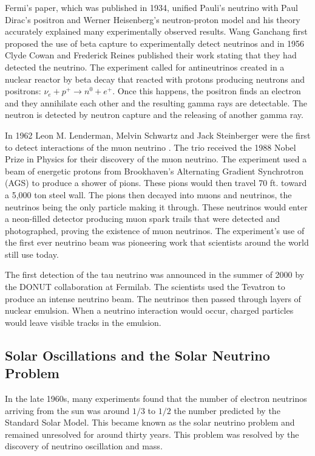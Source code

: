 Fermi's paper, which was published in 1934, unified Pauli's neutrino with Paul Dirac's positron and Werner Heisenberg's neutron-proton model and his theory accurately explained many experimentally observed results. Wang Ganchang first proposed the use of beta capture to experimentally detect neutrinos and in 1956 Clyde Cowan and Frederick Reines published their work stating that they had detected the neutrino. The experiment called for antineutrinos created in a nuclear reactor by beta decay that reacted with protons producing neutrons and positrons: $\nu_{e} +p^{+}\rightarrow n^{0} + e^{+}$. Once this happens, the positron finds an electron and they annihilate each other and the resulting gamma rays are detectable. The neutron is detected by neutron capture and the releasing of another gamma ray. 

In 1962 Leon M. Lenderman, Melvin Schwartz and Jack Steinberger were the first to detect interactions of the muon neutrino \cite{leonlederman}. The trio received the 1988 Nobel Prize in Physics for their discovery of the muon neutrino. The experiment used a beam of energetic protons from Brookhaven's Alternating Gradient Synchrotron (AGS) to produce a shower of pions. These pions would then travel 70 ft. toward a 5,000 ton steel wall. The pions then decayed into muons and neutrinos, the neutrinos being the only particle making it through. These neutrinos would enter a neon-filled detector producing muon spark trails that were detected and photographed, proving the existence of muon neutrinos. The experiment's use of the first ever neutrino beam was pioneering work that scientists around the world still use today.  

The first detection of the tau neutrino was announced in the summer of 2000 by the DONUT collaboration at Fermilab. The scientists used the Tevatron to produce an intense neutrino beam. The neutrinos then passed through layers of nuclear emulsion. When a neutrino interaction would occur, charged particles would leave visible tracks in the emulsion. 

\subsection{Solar Oscillations and the Solar Neutrino Problem}

In the late 1960s, many experiments found that the number of electron neutrinos arriving from the sun was around $1/3$ to $1/2$ the number predicted by the Standard Solar Model. This became known as the solar neutrino problem and remained unresolved for around thirty years. This problem was resolved by the discovery of neutrino oscillation and mass.\cite{neutrino}

